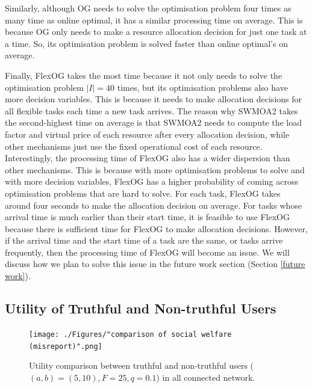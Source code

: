 \documentclass[11pt]{phdthesis}
\begin{document}
Similarly, although OG needs to solve the optimisation problem four times as many time as online optimal, it has a similar processing time on average. This is because OG only needs to make a resource allocation decision for just one task at a time. So, its optimisation problem is solved faster than online optimal's on average. 

Finally, FlexOG takes the most time because it not only needs to solve the optimisation problem $ |I| = 40 $ times, but its optimisation problems also have more decision variables. This is because it needs to make allocation decisions for all flexible tasks each time a new task arrives. The reason why SWMOA2 takes the second-highest time on average is that SWMOA2 needs to compute the load factor and virtual price of each resource after every allocation decision, while other mechanisms just use the fixed operational cost of each resource. Interestingly, the processing time of FlexOG also has a wider dispersion than other mechanisms. This is because with more optimisation problems to solve and with more decision variables, FlexOG has a higher probability of coming across optimisation problems that are hard to solve. For each task, FlexOG takes around four seconds to make the allocation decision on average. For tasks whose arrival time is much earlier than their start time, it is feasible to use FlexOG because there is sufficient time for FlexOG to make allocation decisions. However, if the arrival time and the start time of a task are the same, or tasks arrive frequently, then the processing time of FlexOG will become an issue. We will discuss how we plan to solve this issue in the future work section (Section \ref{future work}).


\subsection{Utility of Truthful and Non-truthful Users} \label{utility evaluation}

\begin{figure}
    \centering
    \texttt{[image: ./Figures/"comparison of social welfare (misreport)".png]}
    \caption{Utility comparison between truthful and non-truthful users ($ (a, b) = (5, 10), F = 25, q = 0.1 $) in all connected network.}
    \label{fig: utility misreport}
\end{figure}
\end{document}
